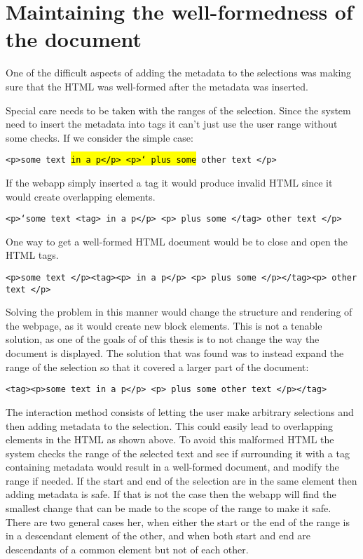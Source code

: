 
\section{Maintaining the well-formedness of the document}
One of the difficult aspects of adding the metadata to the selections was making sure that the HTML was well-formed
after the metadata was inserted.

Special care needs to be taken with the ranges of the selection.
Since the system need to insert the metadata into tags it can't just use the user range without some checks.
If we consider the simple case:

\texttt{<p>some text \hl{in a p</p> <p>` plus some} other text </p>}

If the webapp simply inserted a tag it would produce invalid HTML since it would create overlapping elements.

\texttt{<p>`some text <tag> in a p</p> <p> plus some </tag>  other text </p>}

One way to get a well-formed HTML document would be to close and open the HTML tags.

\texttt{<p>some text </p><tag><p> in a p</p> <p> plus some </p></tag><p>  other text </p>}

Solving the problem in this manner would change the structure and rendering of the webpage,
as it would create new block elements.
This is not a tenable solution, as one of the goals of of this thesis is to not change the way the document is displayed.
The solution that was found was to instead expand the range of the selection so that it covered a larger part of the document:

\texttt{<tag><p>some text in a p</p> <p> plus some other text </p></tag>}

The interaction method consists of letting the user make arbitrary selections and then adding metadata to the selection.
This could easily lead to overlapping elements in the HTML as shown above.
To avoid this malformed HTML the system checks the range of the selected text and see if surrounding it with a tag
containing metadata would result in a well-formed document, and modify the range if needed.
If the start and end of the selection are in the same element then adding metadata is safe.
If that is not the case then the webapp will find the smallest change that can be made to the scope of the range to make it safe.
There are two general cases her, when either the start or the end of the range is in a descendant element of the other,
and when both start and end are descendants of a common element but not of each other.

